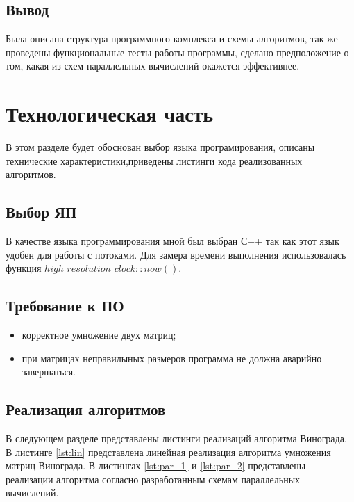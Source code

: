 \documentclass[12pt]{report}
\begin{document}
\section{Вывод}
	Была описана структура программного комплекса и схемы алгоритмов, так же проведены функциональные тесты работы программы, сделано предположение о том, какая из схем параллельных вычислений окажется эффективнее.

\chapter{Технологическая часть}

В этом разделе будет обоснован выбор языка програмирования, описаны технические характеристики,приведены листинги кода реализованных алгоритмов.

\section{Выбор ЯП}
В качестве языка программирования мной был выбран С++ так как этот язык удобен для работы с потоками.
Для замера времени выполнения использовалась функция $high\_resolution\_clock::now()$.

\section{Требование к ПО}

\begin{itemize}
	\item корректное умножение двух матриц;
	\item при матрицах неправилыных размеров программа не должна аварийно завершаться.
\end{itemize}

\section{Реализация алгоритмов}

В следующем разделе представлены листинги реализаций алгоритма Винограда.
В листинге \ref{lst:lin} представлена линейная реализация алгоритма умножения матриц Винограда. В листингах \ref{lst:par_1} и \ref{lst:par_2} представлены реализации алгоритма согласно разработанным схемам параллельных вычислений.

\newpage
\end{document}

